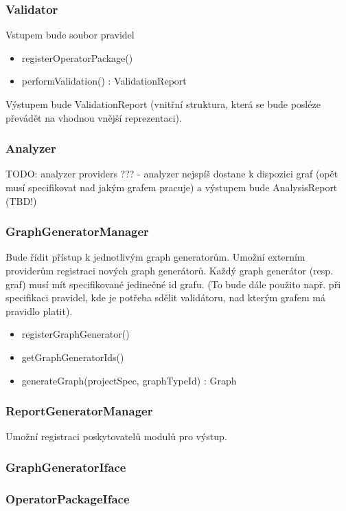 \subsubsection{Validator}
Vstupem bude soubor pravidel

\begin{itemize}
\item registerOperatorPackage()
\item performValidation() : ValidationReport
\end{itemize}

Výstupem bude ValidationReport (vnitřní struktura, která se bude posléze převádět na vhodnou vnější reprezentaci).

\subsubsection{Analyzer}
TODO: analyzer providers ??? - analyzer nejspíš dostane k dispozici graf (opět musí specifikovat nad jakým grafem pracuje) a výstupem bude AnalysisReport (TBD!)

\subsubsection{GraphGeneratorManager}
Bude řídit přístup k jednotlivým graph generatorům. Umožní externím providerům registraci nových graph generátorů. Každý graph generátor (resp. graf) musí mít specifikované jedinečné id grafu. (To bude dále použito např. při specifikaci pravidel, kde je potřeba sdělit validátoru, nad kterým grafem má pravidlo platit).
\begin{itemize}
\item registerGraphGenerator()
\item getGraphGeneratorIds()
\item generateGraph(projectSpec, graphTypeId) : Graph
\end{itemize}

\subsubsection{ReportGeneratorManager}
Umožní registraci poskytovatelů modulů pro výstup.

\subsubsection{GraphGeneratorIface}
\subsubsection{OperatorPackageIface}
